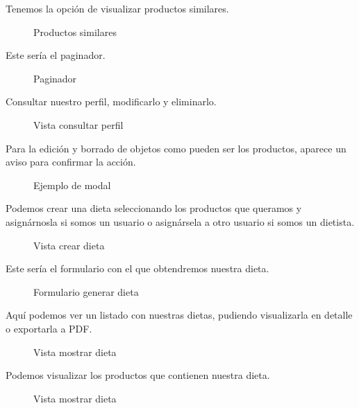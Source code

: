 Tenemos la opción de visualizar productos similares.

\begin{figure}[H]
    \centering
    \noindent{}
    \caption{Productos similares}
  \end{figure}

\newpage
Este sería el paginador.

\begin{figure}[H]
  \centering
  \noindent{}
  \caption{Paginador}
\end{figure}

Consultar nuestro perfil, modificarlo y eliminarlo.

\begin{figure}[H]
  \centering
  \noindent{}
  \caption{Vista consultar perfil}
\end{figure}

\newpage
Para la edición y borrado de objetos como pueden ser los productos, aparece un aviso para confirmar la acción.

\begin{figure}[H]
  \centering
  \noindent{}
  \caption{Ejemplo de modal}
\end{figure}

Podemos crear una dieta seleccionando los productos que queramos y asignárnosla si somos un usuario o asignársela a otro usuario si somos un dietista.

\begin{figure}[H]
  \centering
  \noindent{}
  \caption{Vista crear dieta}
\end{figure}

\newpage
Este sería el formulario con el que obtendremos nuestra dieta.

\begin{figure}[H]
    \centering
    \noindent{}
    \caption{Formulario generar dieta}
  \end{figure}
  
Aquí podemos ver un listado con nuestras dietas, pudiendo visualizarla en detalle o exportarla a PDF.
  
  \begin{figure}[H]
    \centering
    \noindent{}
    \caption{Vista mostrar dieta}
  \end{figure}

\newpage
Podemos visualizar los productos que contienen nuestra dieta.

\begin{figure}[H]
    \centering
    \noindent{}
    \caption{Vista mostrar dieta}
  \end{figure}


